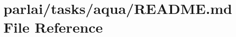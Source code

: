 \hypertarget{parlai_2tasks_2aqua_2README_8md}{}\section{parlai/tasks/aqua/\+R\+E\+A\+D\+ME.md File Reference}
\label{parlai_2tasks_2aqua_2README_8md}
